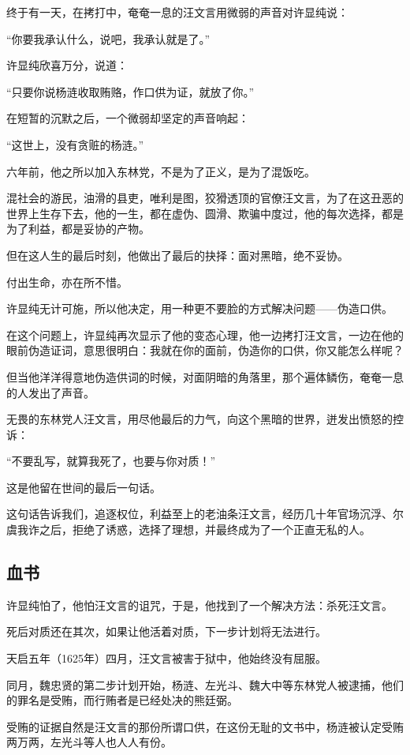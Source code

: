 \begin{multicols}{\theparacolNo}
		终于有一天，在拷打中，奄奄一息的汪文言用微弱的声音对许显纯说：

		“你要我承认什么，说吧，我承认就是了。”

		许显纯欣喜万分，说道：

		“只要你说杨涟收取贿赂，作口供为证，就放了你。”

		在短暂的沉默之后，一个微弱却坚定的声音响起：

		“这世上，没有贪赃的杨涟。”

		六年前，他之所以加入东林党，不是为了正义，是为了混饭吃。

		混社会的游民，油滑的县吏，唯利是图，狡猾透顶的官僚汪文言，为了在这丑恶的世界上生存下去，他的一生，都在虚伪、圆滑、欺骗中度过，他的每次选择，都是为了利益，都是妥协的产物。

		但在这人生的最后时刻，他做出了最后的抉择：面对黑暗，绝不妥协。

		付出生命，亦在所不惜。

		许显纯无计可施，所以他决定，用一种更不要脸的方式解决问题——伪造口供。

		在这个问题上，许显纯再次显示了他的变态心理，他一边拷打汪文言，一边在他的眼前伪造证词，意思很明白：我就在你的面前，伪造你的口供，你又能怎么样呢？

		但当他洋洋得意地伪造供词的时候，对面阴暗的角落里，那个遍体鳞伤，奄奄一息的人发出了声音。

		无畏的东林党人汪文言，用尽他最后的力气，向这个黑暗的世界，迸发出愤怒的控诉：

		“不要乱写，就算我死了，也要与你对质！”

		这是他留在世间的最后一句话。

		这句话告诉我们，追逐权位，利益至上的老油条汪文言，经历几十年官场沉浮、尔虞我诈之后，拒绝了诱惑，选择了理想，并最终成为了一个正直无私的人。

		\subsection{血书}
		许显纯怕了，他怕汪文言的诅咒，于是，他找到了一个解决方法：杀死汪文言。

		死后对质还在其次，如果让他活着对质，下一步计划将无法进行。

		天启五年（1625年）四月，汪文言被害于狱中，他始终没有屈服。

		同月，魏忠贤的第二步计划开始，杨涟、左光斗、魏大中等东林党人被逮捕，他们的罪名是受贿，而行贿者是已经处决的熊廷弼。

		受贿的证据自然是汪文言的那份所谓口供，在这份无耻的文书中，杨涟被认定受贿两万两，左光斗等人也人人有份。


\end{multicols}
